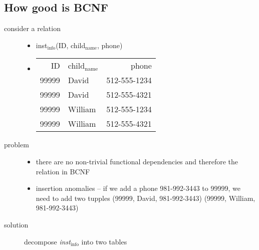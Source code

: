\documentclass[11pt]{article}
\begin{document}
\subsection{How good is BCNF}
\label{sec-13-5}
\begin{description}
\item[{consider a relation}] \begin{itemize}
\item inst$_{\text{info}}$(ID, child$_{\text{name}}$, phone)
\item \begin{center}
\begin{tabular}{rlr}
ID & child$_{\text{name}}$ & phone\\
99999 & David & 512-555-1234\\
99999 & David & 512-555-4321\\
99999 & William & 512-555-1234\\
99999 & William & 512-555-4321\\
\end{tabular}
\end{center}
\end{itemize}
\item[{problem}] \begin{itemize}
\item there are no non-trivial functional dependencies and therefore
the relation in BCNF
\item insertion anomalies -- if we add a phone 981-992-3443 to 99999,
we need to add two tupples
(99999, David, 981-992-3443)
(99999, William, 981-992-3443)
\end{itemize}
\item[{solution}] decompose \emph{inst$_{\text{info}}$} into two tables
\end{description}
\end{document}
